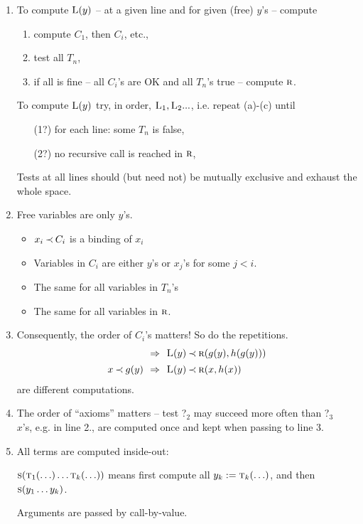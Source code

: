 \documentclass[leqno]{article}
\newcommand{\ina}{\hspace*{1em}}
\newcommand{\func}[1]{\mbox{\sc #1}}
\newcommand{\f}[1]{\func{#1}}
\begin{document}
\begin{enumerate}\MyLPar
\item 
To compute $\f L(y)$ -- at a given line and for given (free) $y$'s -- compute 
 \begin{enumerate}
  \item compute $C_1$, then $C_i$, etc.,
  \item  test all $T_n$,
  \item if all is fine -- all $C_i$'s are OK and all $T_n$'s true -- compute $\f r$.
 \end{enumerate}
To compute $\f L(y)$ try, in order, $\f L_1, \f L_2...$, i.e. repeat (a)-(c) until 
 \begin{itemize}
\item[(1?)] for each line: some $T_n$ is false, 
\item[(2?)] no recursive call is reached in $\f r$,
\end{itemize}
Tests at all lines should (but need not) be mutually exclusive and 
exhaust the whole space. 
\item Free variables are only $y$'s.
 \begin{itemize}
 \item $x_i\mathbin{\prec} C_i$ is a binding of $x_i$
 \item Variables in $C_i$ are either $y$'s or $x_j$'s for some $j<i$.
 \item The same for all variables in $T_n$'s
 \item The same for all variables in $\f r$.
 \end{itemize}
\item
Consequently, the order of $C_i$'s matters! So do the repetitions.
\begin{equation}
\begin{array}{r@{\ \ \impl\ \ }l}
 & \f L(y) \Incl \f r(g(y), h(g(y))) \\[1ex] %
x\Incl g(y) & \f L(y) \Incl \f r(x,h(x)) \end{array}
\end{equation}
are different computations.
\item The order of ``axioms'' matters -- test ?$_2$ may succeed more often than ?$_3$\\
 $x$'s, e.g. in line 2., are computed once and kept when passing to line 3.
\item All terms are computed inside-out: \vspace*{-1ex}
\begin{center}
$\f s(\f t_1(\ldots)\ldots \f t_k(\ldots))$ means
\ina first compute all $y_k:=\f t_k(\ldots)$, and then $\f s(y_1\ldots y_k)$.\vspace*{-1ex}
\end{center}
Arguments are passed by call-by-value.
\end{enumerate}
%
\end{document}

